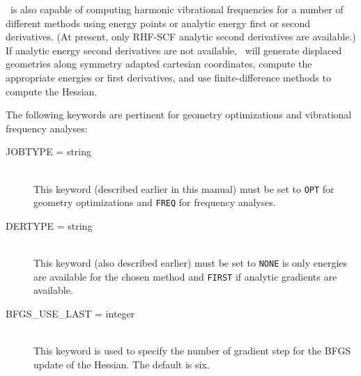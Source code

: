 \PSIthree\ is also capable of computing harmonic vibrational frequencies
for a number of different methods using energy points or analytic energy first or
second derivatives.  (At present, only RHF-SCF analytic second derivatives
are available.)  If analytic energy second derivatives are not available,
\PSIthree\ will generate displaced geometries along symmetry adapted cartesian
coordinates, compute the appropriate energies or first derivatives, and use finite-difference
methods to compute the Hessian.

The following keywords are pertinent for geometry optimizations and
vibrational frequency analyses:
\begin{description}
\item[JOBTYPE = string]\mbox{}\\
This keyword (described earlier in this manual) must be set to
{\tt OPT} for geometry optimizations and {\tt FREQ} for frequency analyses.
\item[DERTYPE = string]\mbox{}\\
This keyword (also described earlier) must be set to {\tt NONE} is only
energies are available for the chosen method and {\tt FIRST} if analytic
gradients are available.
\item[BFGS\_USE\_LAST = integer]\mbox{}\\ This keyword is used to specify
the number of gradient step for the BFGS update of the Hessian.  The default
is six.  
\end{description}
